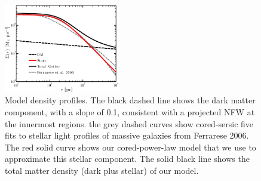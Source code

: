 \documentclass[chicago]{emulateapj}
\begin{document}
\begin{figure}
\begin{center}
\centering
\includegraphics[trim= 0 0 5 6, clip, width=0.45\textwidth]{figures/f_01.eps}
\centering
\end{center}
\caption{ Model density profiles. The black dashed line shows the dark matter component, with a slope of 0.1, consistent with a projected NFW at the innermost regions. the grey dashed curves show cored-sersic five fits to stellar light profiles of massive galaxies from Ferrarese 2006. The red solid curve shows our cored-power-law model that we use to approximate this stellar component. The solid black line shows the total matter density (dark plus stellar) of our model. 
\label{fig2}}
\end{figure}


\end{document}
